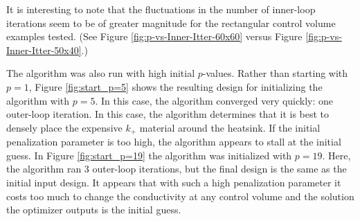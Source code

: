 It is interesting to note that the fluctuations in the number of inner-loop iterations seem to be of greater magnitude for the rectangular control volume examples tested. (See Figure \ref{fig:p-vs-Inner-Itter-60x60} versus Figure \ref{fig:p-vs-Inner-Itter-50x40}.)

The algorithm was also run with high initial $p$-values. Rather than starting with $p=1$, Figure \ref{fig:start_p=5} shows the resulting design for initializing the algorithm with $p=5$. In this case, the algorithm converged very quickly: one outer-loop iteration. In this case, the algorithm determines that it is best to densely place the expensive $k_+$ material around the heatsink. If the initial penalization parameter is too high, the algorithm appears to stall at the initial guess. In Figure \ref{fig:start_p=19} the algorithm was initialized with $p=19$. Here, the algorithm ran 3 outer-loop iterations, but the final design is the same as the initial input design. It appears that with such a high penalization parameter it costs too much to change the conductivity at any control volume and the solution the optimizer outputs is the initial guess.

